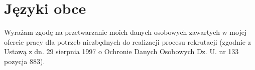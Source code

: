 \documentclass[11pt]{moderncv}
\begin{document}
\section{Języki obce}
\closesection





\footnotesize
Wyrażam zgodę na przetwarzanie moich danych osobowych zawartych w mojej ofercie pracy dla potrzeb niezbędnych do realizacji procesu rekrutacji (zgodnie z Ustawą z dn. 29 sierpnia 1997 o Ochronie Danych Osobowych Dz. U. nr 133 pozycja 883).
\end{document}
